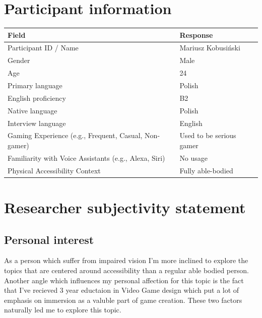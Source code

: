 \section{Participant information}
\begin{table}[h]
\centering
\begin{tabular}{|p{5cm}|p{10cm}|}
\hline
\textbf{Field} & \textbf{Response} \\ \hline
Participant ID / Name & Mariusz Kobusiński \\[1.5cm] \hline
Gender & Male \\[1.5cm] \hline
Age & 24 \\[1.5cm] \hline
Primary language & Polish \\[1.5cm] \hline
English proficiency & B2 \\[1.5cm] \hline
Native language & Polish \\[1.5cm] \hline
Interview language & English \\[1.5cm] \hline
Gaming Experience (e.g., Frequent, Casual, Non-gamer) & Used to be serious gamer\\[1.5cm] \hline %
Familiarity with Voice Assistants (e.g., Alexa, Siri) & No usage \\[1.5cm] \hline
Physical Accessibility Context & Fully able-bodied \\[2cm] \hline
\end{tabular}
\end{table}


\section{Researcher subjectivity statement}

\subsection{Personal interest}

    As a person which suffer from impaired vision I'm more inclined to explore the topics that are centered around accessibility than a regular able bodied person.
Another angle which influences my personal affection for this topic is the fact that I've recieved 3 year eductaion in Video Game design which put a lot of emphasis on immersion
as a valuble part of game creation. These two factors naturally led me to explore this topic.
